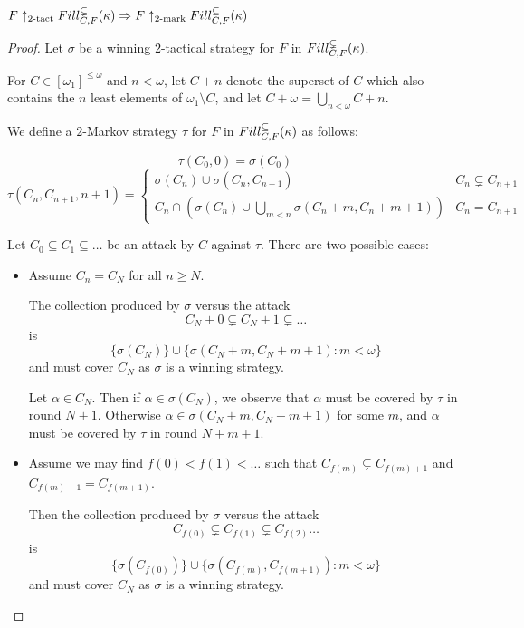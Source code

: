   \begin{theorem}
    $F\uparrow_{2\text{-tact}}Fill^{\subsetneq}_{C,F}(\kappa) \Rightarrow F\uparrow_{2\text{-mark}}Fill^{\subseteq}_{C,F}(\kappa)$
  \end{theorem}

  \begin{proof}
    Let $\sigma$ be a winning $2$-tactical strategy for $F$ in $Fill^{\subsetneq}_{C,F}(\kappa)$.

    For $C\in [\omega_1]^{\leq\omega}$ and $n<\omega$, let $C+n$ denote the superset of $C$ which also contains the $n$ least elements of $\omega_1\setminus C$, and let $C+\omega = \bigcup_{n<\omega} C + n$.

    We define a $2$-Markov strategy $\tau$ for $F$ in $Fill^{\subseteq}_{C,F}(\kappa)$ as follows:

      \[
        \tau(C_0,0) = \sigma(C_0)
      \]
      \[
        \tau(C_n,C_{n+1},n+1) = \left\{
      \begin{array}{ll}
        \sigma(C_n)\cup \sigma(C_n,C_{n+1}) & C_n\subsetneq C_{n+1} \\
        C_n \cap \left(\sigma(C_n) \cup \bigcup_{m<n} \sigma(C_n+m,C_n+m+1) \right) & C_n=C_{n+1}
      \end{array}
      \right.
      \]

    Let $C_0 \subseteq C_1 \subseteq \dots$ be an attack by $C$ against $\tau$. There are two possible cases:

      \begin{itemize}
        \item
          Assume $C_n=C_N$ for all $n\geq N$.

          The collection produced by $\sigma$ versus the attack
            \[
              C_N+0 \subsetneq C_N+1 \subsetneq \dots
            \] 
          is 
            \[
              \{\sigma(C_N)\}\cup\{\sigma(C_N+m,C_N+m+1) : m<\omega\}
            \]
          and must cover $C_N$ as $\sigma$ is a winning strategy.

          Let $\alpha \in C_N$. Then if $\alpha \in \sigma(C_N)$, we observe that $\alpha$ must be covered by $\tau$ in round $N+1$. Otherwise $\alpha \in \sigma(C_N+m,C_N+m+1)$ for some $m$, and $\alpha$ must be covered by $\tau$ in round $N+m+1$.

        \item
          Assume we may find $f(0)<f(1)<\dots$ such that $C_{f(m)}\subsetneq C_{f(m)+1}$ and $C_{f(m)+1}=C_{f(m+1)}$.

          Then the collection produced by $\sigma$ versus the attack 
            \[
              C_{f(0)}\subsetneq C_{f(1)} \subsetneq C_{f(2)} \dots
            \]
          is 
            \[
              \{\sigma(C_{f(0)})\}\cup\{\sigma(C_{f(m)},C_{f(m+1)}):m<\omega\}
            \]
          and must cover $C_N$ as $\sigma$ is a winning strategy.


\end{itemize}
\end{proof}
